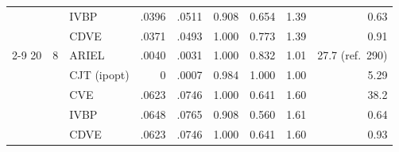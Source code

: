 \begin{table}[htbp]
\begin{tabular}{rrlrrrrrr}
 &  & IVBP & .0396 & .0511 & 0.908 & 0.654 & 1.39 & 0.63 \\
 &  & CDVE & .0371 & .0493 & 1.000 & 0.773 & 1.39 & 0.91 \\
\cmidrule(l){2-9}
20 & 8 & ARIEL & .0040 & .0031 & 1.000 & 0.832 & 1.01 & 27.7 (ref.\ 290) \\
 &  & CJT (ipopt) & 0 & .0007 & 0.984 & 1.000 & 1.00 & 5.29 \\
 &  & CVE & .0623 & .0746 & 1.000 & 0.641 & 1.60 & 38.2 \\
 &  & IVBP & .0648 & .0765 & 0.908 & 0.560 & 1.61 & 0.64 \\
 &  & CDVE & .0623 & .0746 & 1.000 & 0.641 & 1.60 & 0.93 \\
\bottomrule
\end{tabular}
\end{table}

